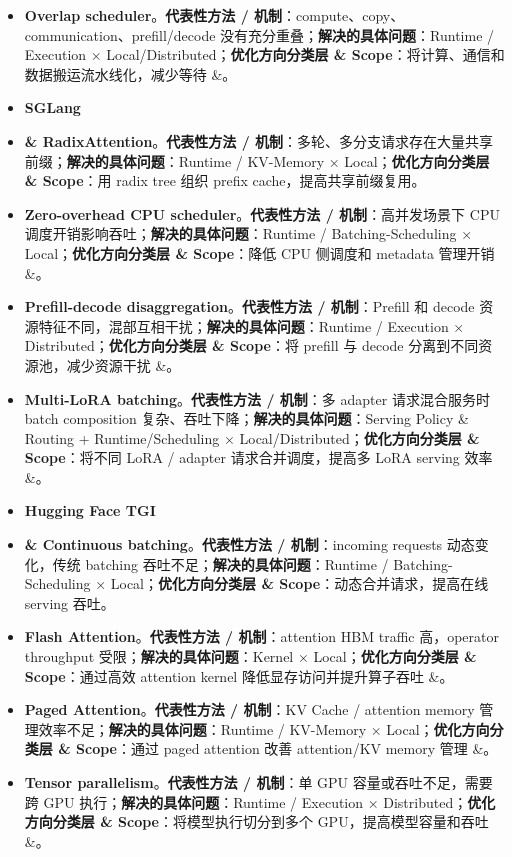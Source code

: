 \documentclass[a4paper,twocolumn,10pt]{ctexart}
\begin{document}
\begin{itemize}
\item \textbf{Overlap scheduler}。\textbf{代表性方法 / 机制}：compute、copy、communication、prefill/decode 没有充分重叠；\textbf{解决的具体问题}：Runtime / Execution × Local/Distributed；\textbf{优化方向分类层 \& Scope}：将计算、通信和数据搬运流水线化，减少等待 \&。
\item \textbf{SGLang}
\item \textbf{\& RadixAttention}。\textbf{代表性方法 / 机制}：多轮、多分支请求存在大量共享前缀；\textbf{解决的具体问题}：Runtime / KV-Memory × Local；\textbf{优化方向分类层 \& Scope}：用 radix tree 组织 prefix cache，提高共享前缀复用。
\item \textbf{Zero-overhead CPU scheduler}。\textbf{代表性方法 / 机制}：高并发场景下 CPU 调度开销影响吞吐；\textbf{解决的具体问题}：Runtime / Batching-Scheduling × Local；\textbf{优化方向分类层 \& Scope}：降低 CPU 侧调度和 metadata 管理开销 \&。
\item \textbf{Prefill-decode disaggregation}。\textbf{代表性方法 / 机制}：Prefill 和 decode 资源特征不同，混部互相干扰；\textbf{解决的具体问题}：Runtime / Execution × Distributed；\textbf{优化方向分类层 \& Scope}：将 prefill 与 decode 分离到不同资源池，减少资源干扰 \&。
\item \textbf{Multi-LoRA batching}。\textbf{代表性方法 / 机制}：多 adapter 请求混合服务时 batch composition 复杂、吞吐下降；\textbf{解决的具体问题}：Serving Policy \& Routing + Runtime/Scheduling × Local/Distributed；\textbf{优化方向分类层 \& Scope}：将不同 LoRA / adapter 请求合并调度，提高多 LoRA serving 效率 \&。
\item \textbf{Hugging Face TGI}
\item \textbf{\& Continuous batching}。\textbf{代表性方法 / 机制}：incoming requests 动态变化，传统 batching 吞吐不足；\textbf{解决的具体问题}：Runtime / Batching-Scheduling × Local；\textbf{优化方向分类层 \& Scope}：动态合并请求，提高在线 serving 吞吐。
\item \textbf{Flash Attention}。\textbf{代表性方法 / 机制}：attention HBM traffic 高，operator throughput 受限；\textbf{解决的具体问题}：Kernel × Local；\textbf{优化方向分类层 \& Scope}：通过高效 attention kernel 降低显存访问并提升算子吞吐 \&。
\item \textbf{Paged Attention}。\textbf{代表性方法 / 机制}：KV Cache / attention memory 管理效率不足；\textbf{解决的具体问题}：Runtime / KV-Memory × Local；\textbf{优化方向分类层 \& Scope}：通过 paged attention 改善 attention/KV memory 管理 \&。
\item \textbf{Tensor parallelism}。\textbf{代表性方法 / 机制}：单 GPU 容量或吞吐不足，需要跨 GPU 执行；\textbf{解决的具体问题}：Runtime / Execution × Distributed；\textbf{优化方向分类层 \& Scope}：将模型执行切分到多个 GPU，提高模型容量和吞吐 \&。

\end{itemize}
\end{document}
